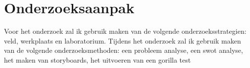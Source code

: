 \chapter{Onderzoeksaanpak}
Voor het onderzoek zal ik gebruik maken van de volgende onderzoeksstrategien: veld, werkplaats en laboratorium. Tijdens het onderzoek zal ik gebruik maken van de volgende onderzoeksmethoden: een probleem analyse, een swot analyse, het maken van storyboards, het uitvoeren van een gorilla test